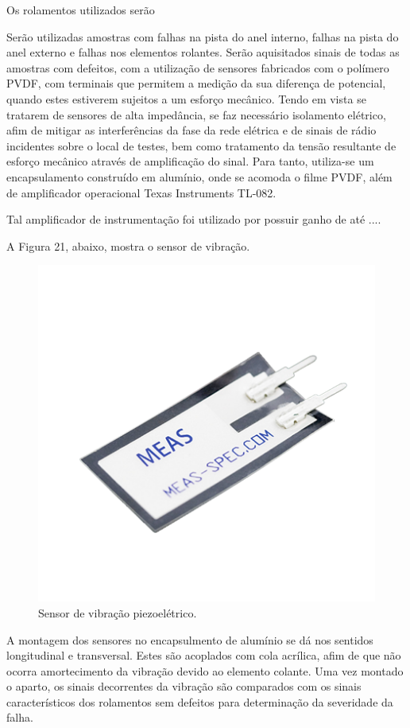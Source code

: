 \documentclass[
	12pt,				
	oneside,			
	a4paper,			
	english,			
	brazil				
	]{abntex2ppgsi}
\begin{document}
Os rolamentos utilizados serão 


Serão utilizadas amostras com falhas na pista do anel interno, falhas na pista do anel externo e falhas nos elementos rolantes. Serão aquisitados sinais de todas as amostras com defeitos, com a utilização de sensores fabricados com o polímero PVDF, com terminais que permitem a medição da sua diferença de potencial, quando estes estiverem sujeitos a um esforço mecânico. Tendo em vista se tratarem de sensores de alta impedância, se faz necessário isolamento elétrico, afim de mitigar as interferências da fase da rede elétrica e de sinais de rádio incidentes sobre o local de testes, bem como tratamento da tensão resultante de esforço mecânico através de amplificação do sinal. Para tanto, utiliza-se um encapsulamento construído em alumínio, onde se acomoda o filme PVDF, além de amplificador operacional Texas Instruments TL-082. 

Tal amplificador de instrumentação foi utilizado por possuir ganho de até .... 

A Figura 21, abaixo, mostra o sensor de vibração. 

\begin{figure}[!htb]
\centering
\includegraphics{Figura21}
\caption {Sensor de vibração piezoelétrico.}
\label{Figura21}
\end{figure} 

A montagem dos sensores no encapsulmento de alumínio se dá nos sentidos longitudinal e transversal. Estes são acoplados com cola acrílica, afim de que não ocorra amortecimento da vibração devido ao elemento colante. Uma vez montado o aparto, os sinais decorrentes da vibração são comparados com os sinais característicos dos rolamentos sem defeitos para determinação da severidade da falha.
\end{document}
